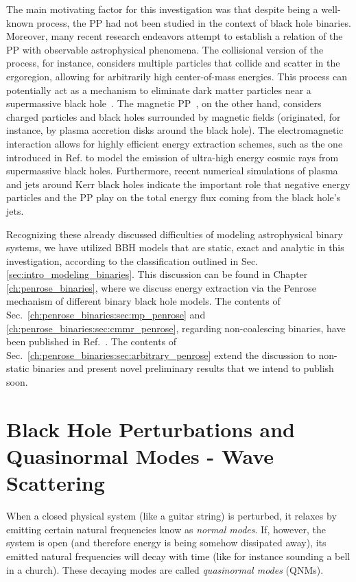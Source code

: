 The main motivating factor for this investigation was that despite being a well-known process, the \ac{PP} had not been studied in the context of black hole binaries. Moreover, many recent research endeavors attempt to establish a relation of the \ac{PP} with observable astrophysical phenomena.
The collisional version of the process, for instance, considers multiple particles that collide and scatter in the ergoregion, allowing for arbitrarily high center-of-mass energies. This process can potentially act as a mechanism to eliminate dark matter particles near a supermassive black hole~\cite{Schnittman:2018ccg}.
The magnetic \ac{PP}~\cite{Wagh1985,Tursunov:2019oiq}, on the other hand, considers charged particles and black holes surrounded by magnetic fields (originated, for instance, by plasma accretion disks around the black hole). The electromagnetic interaction allows for highly efficient energy extraction schemes, such as the one introduced in Ref.\cite{Tursunov:2020juz} to model the emission of ultra-high energy cosmic rays from supermassive black holes. Furthermore, recent numerical simulations of plasma and jets around Kerr black holes indicate the important role that negative energy particles and the \ac{PP} play on the total energy flux coming from the black hole's jets\cite{Parfrey:2018dnc}.

Recognizing these already discussed difficulties of modeling astrophysical binary systems, we have utilized \ac{BBH} models that are static, exact and analytic in this investigation, according to the classification outlined in Sec.\ref{sec:intro_modeling_binaries}.
This discussion can be found in Chapter \ref{ch:penrose_binaries}, where we discuss energy extraction via the Penrose mechanism of different binary black hole models. The contents of Sec.~\ref{ch:penrose_binaries:sec:mp_penrose} and \ref{ch:penrose_binaries:sec:cmmr_penrose}, regarding non-coalescing binaries, have been published in Ref.~\cite{PhysRevD.104.124025}. The contents of Sec.~\ref{ch:penrose_binaries:sec:arbitrary_penrose} extend the discussion to non-static binaries and present novel preliminary results that we intend to publish soon.

\section{Black Hole Perturbations and Quasinormal Modes - Wave Scattering}

When a closed physical system (like a guitar string) is perturbed, it relaxes by emitting certain natural frequencies know as \emph{normal modes}. If, however, the system is open (and therefore energy is being somehow dissipated away), its emitted natural frequencies will decay with time (like for instance sounding a bell in a church). These decaying modes are called \emph{quasinormal modes} (\acp{QNM}).

